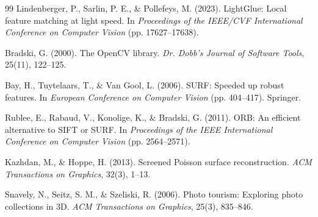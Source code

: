 \begin{thebibliography}{99}
Lindenberger, P., Sarlin, P. E., \& Pollefeys, M. (2023). LightGlue: Local feature matching at light speed. In \textit{Proceedings of the IEEE/CVF International Conference on Computer Vision} (pp. 17627--17638).

Bradski, G. (2000). The OpenCV library. \textit{Dr. Dobb's Journal of Software Tools}, 25(11), 122--125.

Bay, H., Tuytelaars, T., \& Van Gool, L. (2006). SURF: Speeded up robust features. In \textit{European Conference on Computer Vision} (pp. 404--417). Springer.

Rublee, E., Rabaud, V., Konolige, K., \& Bradski, G. (2011). ORB: An efficient alternative to SIFT or SURF. In \textit{Proceedings of the IEEE International Conference on Computer Vision} (pp. 2564--2571).

Kazhdan, M., \& Hoppe, H. (2013). Screened Poisson surface reconstruction. \textit{ACM Transactions on Graphics}, 32(3), 1--13.

Snavely, N., Seitz, S. M., \& Szeliski, R. (2006). Photo tourism: Exploring photo collections in 3D. \textit{ACM Transactions on Graphics}, 25(3), 835--846.

\end{thebibliography}
